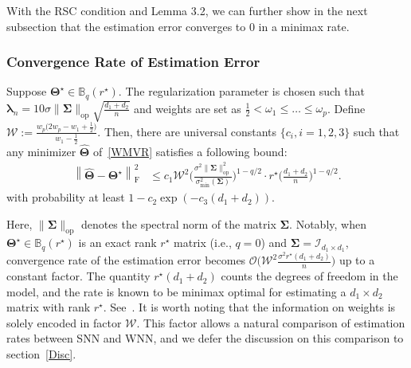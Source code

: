 \documentclass[alpha-refs]{wiley-article}
\begin{document}
With the RSC condition and Lemma 3.2, we can further show in the next subsection that the estimation error converges to $0$ in a minimax rate.

\subsubsection{Convergence Rate of Estimation Error}
\begin{theorem} \label{thm2}
Suppose $\boldsymbol{\Theta^{\star}}\in\mathbb{B}_{q}(r^{\star})$.
The regularization parameter is chosen such that $\boldsymbol{\lambda}_{n}=10\sigma\|\boldsymbol{\Sigma}\|_{\text{op}} \sqrt{\frac{d_{1}+d_{2}}{n}}$ and weights are set 
as $\frac{1}{2} < \omega_{1} \leq \dots \leq \omega_{p}$.
Define $\mathcal{W}:=\frac{w_{p}\big(2w_{p}-w_{1}+\frac{1}{2}\big)}{w_{1}-\frac{1}{2}}$.
Then, there are universal constants $\{c_{i},i=1,2,3\}$ such that any minimizer $\boldsymbol{\widehat{\Theta}}$ of~\eqref{WMVR} satisfies a following bound:
\begin{align} \label{Rate}
    \left\| \widehat{\boldsymbol{\Theta}} - \boldsymbol{\Theta^{\star}} \right\|_{\text{F}}^{2}
    &\leq c_{1} \mathcal{W}^{2} \Bigg( \frac{\sigma^{2}\|\boldsymbol{\Sigma}\|_{\text{op}}^{2}}{\sigma_{\text{min}}^{2}(\boldsymbol{\Sigma})} \Bigg)^{1-q/2} 
    \cdot r^{\star} \Bigg( \frac{d_{1}+d_{2}}{n} \Bigg)^{1-q/2}.
\end{align}
with probability at least $1-c_{2}\exp(-c_{3}(d_{1}+d_{2}))$.
\end{theorem}

Here, $\|\boldsymbol{\Sigma}\|_{\text{op}}$ denotes the spectral norm of the matrix $\boldsymbol{\Sigma}$. 
Notably, when $\boldsymbol{\Theta^{\star}}\in\mathbb{B}_{q}(r^{\star})$ is an exact rank $r^{\star}$ matrix (i.e., $q=0$) and $\boldsymbol{\Sigma} = \mathcal{I}_{d_{1} \times d_{1}}$, 
convergence rate of the estimation error becomes $\mathcal{O}\big( \mathcal{W}^{2} \frac{ \sigma^{2} r^{\star} (d_{1}+d_{2}) }{n} \big)$ up to a constant factor.
The quantity $r^{\star} (d_{1}+d_{2})$ counts the degrees of freedom in the model, and the rate is known to be minimax optimal for estimating a $d_{1} \times d_{2}$ matrix with rank $r^{\star}$.
See~\citet{negahban2011estimation,koltchinskii2011nuclear,rohde2011estimation}.
It is worth noting that the information on weights is solely encoded in factor $\mathcal{W}$.
This factor allows a natural comparison of estimation rates between SNN and WNN, and we defer the discussion on this comparison to section~\ref{Disc}.
\end{document}
